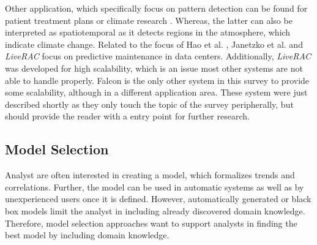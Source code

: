 \documentclass[electronic]{vgtc}             %
\begin{document}
Other application, which specifically focus on pattern detection can be found for patient treatment plans \cite{Gschwandtner:2011} or climate research \cite{Kehrer:2008}.
Whereas, the latter can also be interpreted as spatiotemporal as it detects regions in the atmosphere, which indicate climate change.
Related to the focus of Hao et al. \cite{Hao:2009, Hao:2011}, Janetzko et al. \cite{janetzko:2014} and \textit{LiveRAC} \cite{McLachlan:2008} focus on predictive maintenance in data centers.
Additionally, \textit{LiveRAC} was developed for high scalability, which is an issue most other systems are not able to handle properly.
Falcon \cite{steed:2017} is the only other system in this survey to provide some scalability, although in a different application area. 
These system were just described shortly as they only touch the topic of the survey peripherally, but should provide the reader with a entry point for further research.



\subsection{Model Selection\label{subsec:selection}}
Analyst are often interested in creating a model, which formalizes trends and correlations.
Further, the model can be used in automatic systems as well as by unexperienced users once it is defined. 
However, automatically generated or black box models limit the analyst in including already discovered domain knowledge. 
Therefore, model selection approaches want to support analysts in finding the best model by including domain knowledge. 
\end{document}
